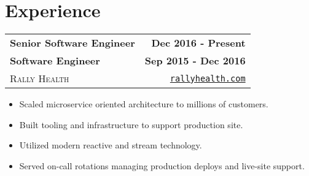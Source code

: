 \documentclass[letterpaper]{article}
\newenvironment{details}
{\begin{itemize}}
{\end{itemize}}
\begin{document}
%
%
%
%


  \section{Experience}

  \noindent
  \begin{tabularx}{\textwidth}{@{}X r@{}}
    \textbf{Senior Software Engineer} & \textbf{Dec 2016 - Present} \\
    \textbf{Software Engineer} & \textbf{Sep 2015 - Dec 2016} \\
    \textsc{Rally Health} & \texttt{\href{http://rallyhealth.com}{rallyhealth.com}}
  \end{tabularx}

  \begin{details}
  \item Scaled microservice oriented architecture to millions of customers.
  \item Built tooling and infrastructure to support production site.
  \item Utilized modern reactive and stream technology.
  \item Served on-call rotations managing production deploys and live-site support.
  \end{details}
\end{document}
